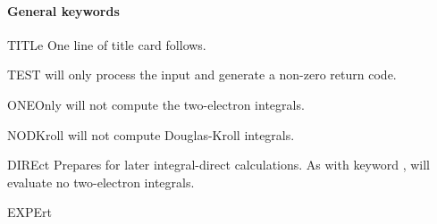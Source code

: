 \paragraph{General keywords}
\begin{keywordlist}
\item[TITLe]
One line of title card follows.
\item[TEST]
 will only process the input and generate a non-zero return code.
\item[ONEOnly]
 will not compute the two-{}electron integrals.
\item[NODKroll]
 will not compute Douglas-Kroll integrals.
\item[DIREct]
Prepares for later integral-{}direct calculations. As with keyword
,  will evaluate no two-{}electron integrals.
\item[EXPErt]

\end{keywordlist}
